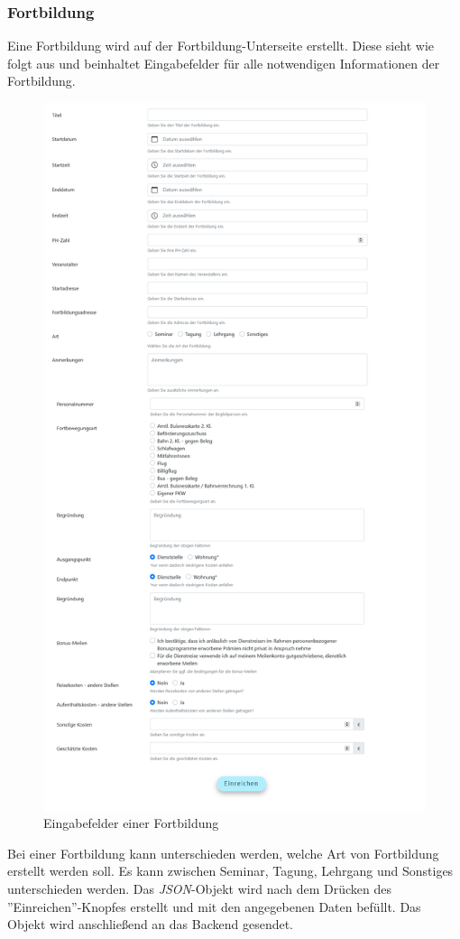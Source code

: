 \subsubsection{Fortbildung}
Eine Fortbildung wird auf der Fortbildung-Unterseite erstellt. Diese sieht wie folgt aus und beinhaltet Eingabefelder für alle notwendigen Informationen der Fortbildung.
\begin{figure}[H]
	\centering
	\includegraphics[width=0.9\linewidth]{images/workshop}
	\caption[Fortbildung]{Eingabefelder einer Fortbildung}
	\label{fig:workshop}
\end{figure}
\newpage
Bei einer Fortbildung kann unterschieden werden, welche Art von Fortbildung erstellt werden soll. Es kann zwischen Seminar, Tagung, Lehrgang und Sonstiges unterschieden werden. Das \textit{JSON}-Objekt wird nach dem Drücken des ''Einreichen''-Knopfes erstellt und mit den angegebenen Daten befüllt. Das Objekt wird anschließend an das Backend gesendet.\\

